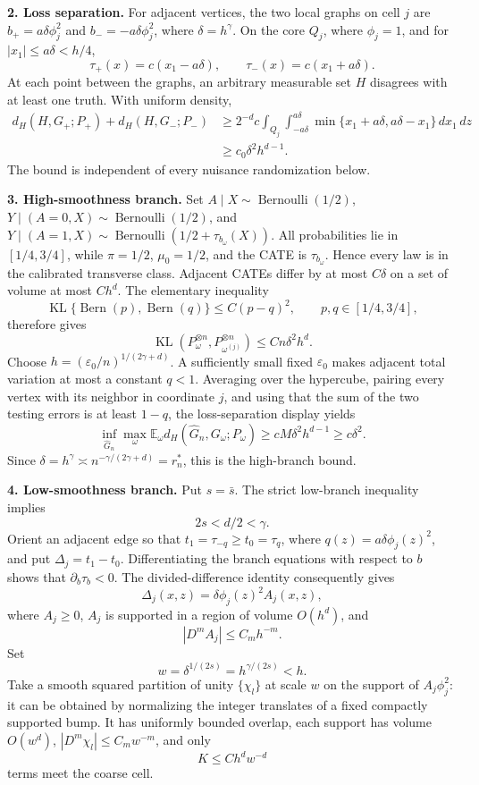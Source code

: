 \textbf{2. Loss separation.} For adjacent vertices, the two local graphs on cell \(j\) are \(b_+=a\delta\phi_j^2\) and \(b_-=-a\delta\phi_j^2\), where \(\delta=h^\gamma\). On the core \(Q_j\), where \(\phi_j=1\), and for \(|x_1|\le a\delta<h/4\),
\[
 \tau_+(x)=c(x_1-a\delta),
 \qquad
 \tau_-(x)=c(x_1+a\delta).
\]
At each point between the graphs, an arbitrary measurable set \(H\) disagrees with at least one truth. With uniform density,
\[
\begin{aligned}
 d_H(H,G_+;P_+)+d_H(H,G_-;P_-)
 &\ge2^{-d}c\int_{Q_j}\int_{-a\delta}^{a\delta}
 \min\{x_1+a\delta,a\delta-x_1\}\,dx_1\,dz\\
 &\ge c_0\delta^2h^{d-1}.
\end{aligned}
\]
The bound is independent of every nuisance randomization below.

\textbf{3. High-smoothness branch.} Set \(A\mid X\sim\operatorname{Bernoulli}(1/2)\), \(Y\mid(A=0,X)\sim\operatorname{Bernoulli}(1/2)\), and \(Y\mid(A=1,X)\sim\operatorname{Bernoulli}(1/2+\tau_{b_\omega}(X))\). All probabilities lie in \([1/4,3/4]\), while \(\pi=1/2\), \(\mu_0=1/2\), and the CATE is \(\tau_{b_\omega}\). Hence every law is in the calibrated transverse class. Adjacent CATEs differ by at most \(C\delta\) on a set of volume at most \(Ch^d\). The elementary inequality
\[
 \operatorname{KL}\{\operatorname{Bern}(p),\operatorname{Bern}(q)\}
 \le C(p-q)^2,
 \qquad p,q\in[1/4,3/4],
\]
therefore gives
\[
 \operatorname{KL}(P_\omega^{\otimes n},P_{\omega^{(j)}}^{\otimes n})
 \le Cn\delta^2h^d.
\]
Choose \(h=(\varepsilon_0/n)^{1/(2\gamma+d)}\). A sufficiently small fixed \(\varepsilon_0\) makes adjacent total variation at most a constant \(q<1\). Averaging over the hypercube, pairing every vertex with its neighbor in coordinate \(j\), and using that the sum of the two testing errors is at least \(1-q\), the loss-separation display yields
\[
 \inf_{\widehat G_n}\max_\omega
 \mathbb E_\omega d_H(\widehat G_n,G_\omega;P_\omega)
 \ge cM\delta^2h^{d-1}\ge c\delta^2.
\]
Since \(\delta=h^\gamma\asymp n^{-\gamma/(2\gamma+d)}=r_n^*\), this is the high-branch bound.

\textbf{4. Low-smoothness branch.} Put \(s=\bar s\). The strict low-branch inequality implies
\[
 2s<d/2<\gamma.
\]
Orient an adjacent edge so that \(t_1=\tau_{-q}\ge t_0=\tau_q\), where \(q(z)=a\delta\phi_j(z)^2\), and put \(\Delta_j=t_1-t_0\). Differentiating the branch equations with respect to \(b\) shows that \(\partial_b\tau_b<0\). The divided-difference identity consequently gives
\[
 \Delta_j(x,z)=\delta\phi_j(z)^2A_j(x,z),
\]
where \(A_j\ge0\), \(A_j\) is supported in a region of volume \(O(h^d)\), and
\[
 |D^mA_j|\le C_mh^{-m}.
\]
Set
\[
 w=\delta^{1/(2s)}=h^{\gamma/(2s)}<h.
\]
Take a smooth squared partition of unity \(\{\chi_l\}\) at scale \(w\) on the support of \(A_j\phi_j^2\): it can be obtained by normalizing the integer translates of a fixed compactly supported bump. It has uniformly bounded overlap, each support has volume \(O(w^d)\), \(|D^m\chi_l|\le C_mw^{-m}\), and only
\[
 K\le Ch^dw^{-d}
\]
terms meet the coarse cell.

